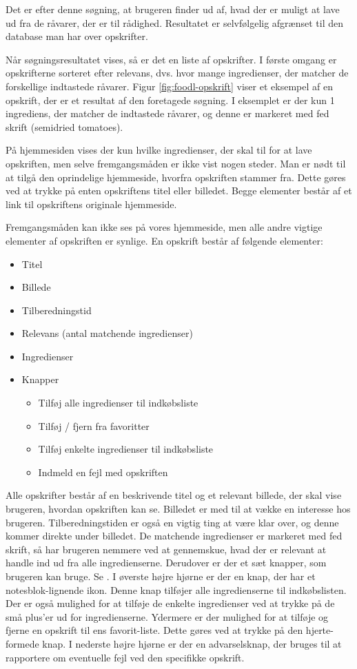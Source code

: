 Det er efter denne søgning, at brugeren finder ud af, hvad der er muligt at lave ud fra de råvarer, der er til rådighed. Resultatet er selvfølgelig afgrænset til den database man har over opskrifter.

Når søgningsresultatet vises, så er det en liste af opskrifter. I første omgang er opskrifterne sorteret efter relevans, dvs. hvor mange ingredienser, der matcher de forskellige indtastede råvarer. Figur \ref{fig:foodl-opskrift} viser et eksempel af en opskrift, der er et resultat af den foretagede søgning. I eksemplet er der kun 1 ingrediens, der matcher de indtastede råvarer, og denne er markeret med fed skrift (semidried tomatoes).

På hjemmesiden vises der kun hvilke ingredienser, der skal til for at lave opskriften, men selve fremgangsmåden er ikke vist nogen steder. Man er nødt til at tilgå den oprindelige hjemmeside, hvorfra opskriften stammer fra. Dette gøres ved at trykke på enten opskriftens titel eller billedet. Begge elementer består af et link til opskriftens originale hjemmeside. 

Fremgangsmåden kan ikke ses på vores hjemmeside, men alle andre vigtige elementer af opskriften er synlige. En opskrift består af følgende elementer:

\begin{itemize}[noitemsep]
\item Titel
\item Billede
\item Tilberedningstid
\item Relevans (antal matchende ingredienser)
\item Ingredienser
\item Knapper
\begin{itemize}[noitemsep]
\item Tilføj alle ingredienser til indkøbsliste
\item Tilføj / fjern fra favoritter
\item Tilføj enkelte ingredienser til indkøbsliste
\item Indmeld en fejl med opskriften
\end{itemize}
\end{itemize}

Alle opskrifter består af en beskrivende titel og et relevant billede, der skal vise brugeren, hvordan opskriften kan se. Billedet er med til at vække en interesse hos brugeren. Tilberedningstiden er også en vigtig ting at være klar over, og denne kommer direkte under billedet. De matchende ingredienser er markeret med fed skrift, så har brugeren nemmere ved at gennemskue, hvad der \fx er relevant at handle ind ud fra alle ingredienserne. Derudover er der et sæt knapper, som brugeren kan bruge. Se . I øverste højre hjørne er der en knap, der har et notesblok-lignende ikon. Denne knap tilføjer alle ingredienserne til indkøbslisten. Der er også mulighed for at tilføje de enkelte ingredienser ved at trykke på de små plus'er ud for ingredienserne. Ydermere er der mulighed for at tilføje og fjerne en opskrift til ens favorit-liste. Dette gøres ved at trykke på den hjerte-formede knap. I nederste højre hjørne er der en advarselsknap, der bruges til at rapportere om eventuelle fejl ved den specifikke opskrift.

